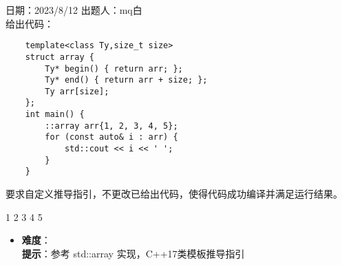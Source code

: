 日期：2023/8/12 出题人：mq白\\

给出代码：

\begin{verbatim}
    template<class Ty,size_t size>
    struct array {
        Ty* begin() { return arr; };
        Ty* end() { return arr + size; };
        Ty arr[size];
    };
    int main() {
        ::array arr{1, 2, 3, 4, 5};
        for (const auto& i : arr) {
            std::cout << i << ' ';
        }
    }
\end{verbatim}

要求自定义推导指引，不更改已给出代码，使得代码成功编译并满足运行结果。

\begin{tcolorbox}[title = {要求运行结果},
    fonttitle = \bfseries, fontupper = \sffamily, fontlower = \itshape]
    1 2 3 4 5 
\end{tcolorbox}

\begin{itemize}
    \item \textbf{难度}：  \\
    \textbf{提示}：参考 std::array 实现，C++17类模板推导指引
\end{itemize}